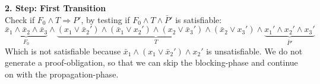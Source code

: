 \documentclass[11pt, a4paper, BCOR=10mm, ngerman]{scrbook}
\begin{document}
\textbf{2. Step: First Transition}\\
Check if $F_0 \land T \Rightarrow P'$, by testing if $F_0 \land T \land \bar P'$ is satisfiable: 
\begin{equation*}
\underbrace{\bar x_1 \land \bar x_2 \land \bar x_3}_{F_0} \land \underbrace{(x_1 \lor \bar x_2' ) \land ( \bar x_1 \lor x_2') \land (x_2 \lor \bar x_3') \land ( \bar x_2 \lor x_3')}_{T} \land \underbrace{ x_1' \land x_2' \land x_3'}_{\bar P'}
\end{equation*}
Which is not satisfiable because $\bar x_1 \land (x_1 \lor \bar x_2') \land x_2'$ is unsatisfiable. We do not generate a proof-obligation, so that we can skip the blocking-phase and continue on with the propagation-phase. \\ \\ \par
\end{document}
